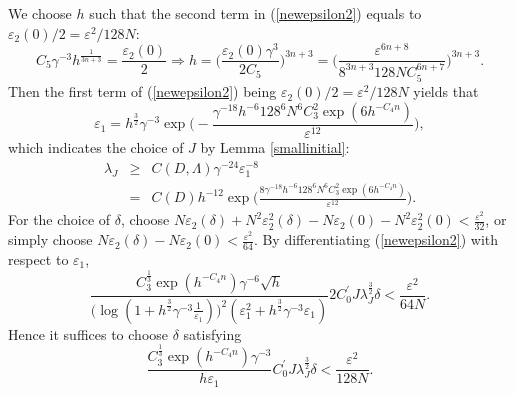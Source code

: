\documentclass[11pt,letterpaper]{amsart}
\numberwithin{equation}{section}
\theoremstyle{definition}
\theoremstyle{plain}
\theoremstyle{definition}
\theoremstyle{plain}
\theoremstyle{definition}
\theoremstyle{plain}
\begin{document}
We choose $h$ such that the second term in (\ref{newepsilon2}) equals to $\varepsilon_2(0)/2=\varepsilon^2/128N$:
\begin{equation}\label{Bh}
C_5\gamma^{-3}h^{\frac{1}{3n+3}}=\frac{\varepsilon_2(0)}{2} \Longrightarrow h=\big(\frac{\varepsilon_2(0)\gamma^3}{2C_5}\big)^{3n+3}=\big(\frac{\varepsilon^{6n+8}}{8^{3n+3}128NC_5^{6n+7}}\big)^{3n+3}.
\end{equation}
Then the first term of (\ref{newepsilon2}) being $\varepsilon_2(0)/2=\varepsilon^2/128N$ yields that
\begin{equation}\label{Bepsilon1}
\varepsilon_1=h^{\frac{3}{2}}\gamma^{-3}\exp\bigg(-\frac{\gamma^{-18}h^{-6} 128^6 N^6 C_3^{2}\exp(6h^{-C_4 n})}{\varepsilon^{12}}\bigg),
\end{equation}
which indicates the choice of $J$ by Lemma \ref{smallinitial}:
\begin{eqnarray}\label{BlambdaJ}
\lambda_{J}&\geqslant& C(D,\Lambda)\gamma^{-24}\varepsilon_1^{-8} \nonumber \\
&=&C(D)h^{-12}\exp\bigg(\frac{8 \gamma^{-18}h^{-6} 128^6 N^6 C_3^{2}\exp(6h^{-C_4 n})}{\varepsilon^{12}}\bigg).
\end{eqnarray}
For the choice of $\delta$, choose $N\varepsilon_2(\delta)+N^2\varepsilon_2^2(\delta)-N\varepsilon_2(0)-N^2\varepsilon_2^2(0)<\frac{\varepsilon^2}{32}$, or simply choose $N\varepsilon_2(\delta)-N\varepsilon_2(0)<\frac{\varepsilon^2}{64}$. By differentiating (\ref{newepsilon2}) with respect to $\varepsilon_1$,
$$\frac{C_3^{\frac{1}{3}}\exp(h^{-C_4 n})\gamma^{-6}\sqrt{h}}{\big(\log (1+h^{\frac{3}{2}}\gamma^{-3}\frac{1}{\varepsilon_1})\big)^2(\varepsilon_1^2+h^{\frac{3}{2}}\gamma^{-3}\varepsilon_1)}2C_0^{\prime}J\lambda_{J}^{\frac{3}{2}}\delta<\frac{\varepsilon^2}{64N}.$$
Hence it suffices to choose $\delta$ satisfying
\begin{equation}\label{delta}
\frac{C_3^{\frac{1}{3}}\exp(h^{-C_4 n})\gamma^{-3}}{h\varepsilon_1}C_0^{\prime}J\lambda_{J}^{\frac{3}{2}}\delta<\frac{\varepsilon^2}{128N}.
\end{equation}
\end{document}

